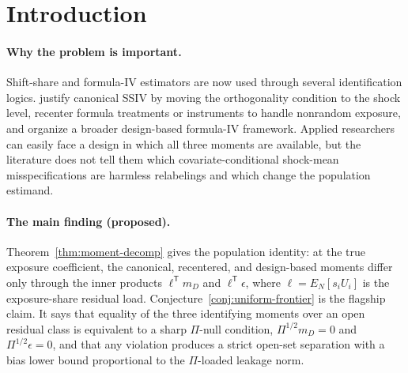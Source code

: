 \documentclass[11pt]{article}
\newcommand{\transpose}{\mathsf{T}}
\theoremstyle{definition}
\theoremstyle{plain}
\theoremstyle{remark}
\begin{document}
\begin{abstract}
This proposal asks when three named shift-share/formula-IV moments identify the same structural exposure coefficient: canonical Bartik SSIV, Borusyak--Hull recentered IV, and design-based formula IV.  The kernel is a leakage-null frontier: recentering and full design conditioning are equivalent exactly when the unmodeled covariate-conditional shock mean \(\epsilon=m_D-m_R\) is invisible to the exposure-share residual direction, while canonical SSIV additionally requires the entire design mean \(m_D\) to be invisible.  The routine population decomposition is a theorem, but the flagship conjecture is the sharp uniform version: over an open class of finite-support formula-IV designs, any positive \(\Pi\)-loaded leakage mass produces a strict recentered-versus-design limit-functional gap, not merely a different variance formula.  This positions recentering as a projection operation with an auditable null space rather than as a blanket cure for nonrandom exposure.  If resolved, the result would give empirical shift-share users a finite-support matrix diagnostic for whether a recentered formula instrument and a richer design-based instrument can be interpreted as the same IV design.
\end{abstract}

\section{Introduction}
\paragraph{Why the problem is important.}
Shift-share and formula-IV estimators are now used through several identification logics.  \citet{BorusyakHullJaravel2022REStud} justify canonical SSIV by moving the orthogonality condition to the shock level, \citet{BorusyakHull2023Econometrica} recenter formula treatments or instruments to handle nonrandom exposure, and \citet{BorusyakHullJaravel2025ECTJ} organize a broader design-based formula-IV framework.  Applied researchers can easily face a design in which all three moments are available, but the literature does not tell them which covariate-conditional shock-mean misspecifications are harmless relabelings and which change the population estimand.

\paragraph{The main finding (proposed).}
Theorem~\ref{thm:moment-decomp} gives the population identity: at the true exposure coefficient, the canonical, recentered, and design-based moments differ only through the inner products \(\ell^\transpose m_D\) and \(\ell^\transpose\epsilon\), where \(\ell=E_N[s_iU_i]\) is the exposure-share residual load.  Conjecture~\ref{conj:uniform-frontier} is the flagship claim.  It says that equality of the three identifying moments over an open residual class is equivalent to a sharp \(\Pi\)-null condition, \(\Pi^{1/2}m_D=0\) and \(\Pi^{1/2}\epsilon=0\), and that any violation produces a strict open-set separation with a bias lower bound proportional to the \(\Pi\)-loaded leakage norm.
\end{document}
